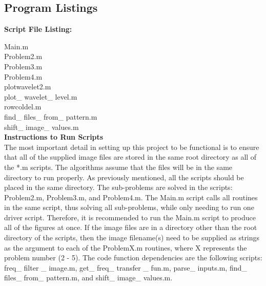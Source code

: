 \documentclass[./rarnold_report5.tex]{subfiles}
\begin{document}
\noindent 
\clearpage



\clearpage

\subsection*{Program Listings}

\noindent \textbf{Script File Listing:}

\noindent Main.m \\
Problem2.m \\
Problem3.m \\
Problem4.m \\
plotwavelet2.m \\
plot\_ wavelet\_ level.m \\
rowcoldel.m \\
find\_ files\_ from\_ pattern.m \\
shift\_ image\_ values.m \\


\noindent \textbf{Instructions to Run Scripts} \\

\noindent The most important detail in setting up this project to be functional is to ensure that all of the supplied image files are stored in the same root directory as all of the *.m scripts.  The algorithms assume that the files will be in the same directory to run properly.  As previously mentioned, all the scripts should be placed in the same directory.  The sub-problems are solved in the scripts: Problem2.m, Problem3.m, and Problem4.m.  The Main.m script calls all routines in the same script, thus solving all sub-problems, while only needing to run one driver script.  Therefore, it is recommended to run the Main.m script to produce all of the figures at once.  If the image files are in a directory other than the root directory of the scripts, then the image filename(s) need to be supplied as strings as the argument to each of the ProblemX.m routines, where X represents the problem number (2 - 5).  The code function dependencies are the following scripts: freq\_ filter \_ image.m, get\_ freq\_ transfer \_ fun.m, parse\_ inputs.m, find\_ files\_ from\_ pattern.m, and shift\_ image\_ values.m.
\end{document}
